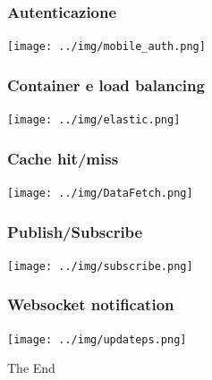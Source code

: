 \documentclass{beamer}
\begin{document}
\begin{frame}
\frametitle{Autenticazione}
\centerline{\texttt{[image: ../img/mobile\_auth.png]}}
\end{frame}


\begin{frame}
\frametitle{Container e load balancing}
\centerline{\texttt{[image: ../img/elastic.png]}}
\end{frame}


\begin{frame}
\frametitle{Cache hit/miss}
\centerline{\texttt{[image: ../img/DataFetch.png]}}
\end{frame}



\begin{frame}
\frametitle{Publish/Subscribe}
\centerline{\texttt{[image: ../img/subscribe.png]}}
\end{frame}

\begin{frame}
\frametitle{Websocket notification}
\centerline{\texttt{[image: ../img/updateps.png]}}
\end{frame}





\begin{frame}
\Huge{\centerline{The End}}
\end{frame}

\end{document}
